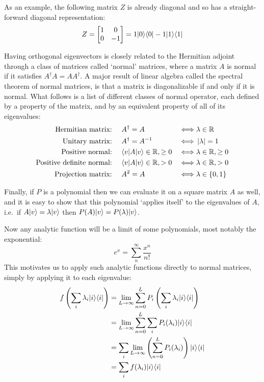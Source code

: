 As an example, the following matrix $Z$ is already diagonal and so has a straight-forward diagonal representation:
\begin{align*}
	Z = \left[\begin{matrix}
		1&0\\
		0&-1
	\end{matrix}\right] = 1| 0 \rangle\langle 0 | - 1| 1 \rangle\langle 1 |
\end{align*}

Having orthogonal eigenvectors is closely related to the Hermitian adjoint through a class of matrices called `normal' matrices, where a matrix $A$ is normal if it satisfies $A^\dagger A = AA^\dagger$. A major result of linear algebra called the spectral theorem of normal matrices, is that a matrix is diagonalizable if and only if it is normal. What follows is a list of different classes of normal operator, each defined by a property of the matrix, and by an equivalent property of all of its eigenvalues:
\begin{align*}
	\text{Hermitian matrix:\ }&&& A^\dagger = A & \iff& \lambda \in \mathbb{R} \\
	\text{Unitary matrix:\ }&&& A^\dagger = A^{-1} & \iff& \left| \lambda \right|=1 \\
	\text{Positive normal:\ }&&& \langle v |A| v \rangle \in \mathbb{R}, \geq 0 & \iff& \lambda \in \mathbb{R}, \geq 0 \\
	\text{Positive definite normal:\ }&&& \langle v |A| v \rangle \in \mathbb{R}, > 0 & \iff& \lambda \in \mathbb{R}, > 0 \\
	\text{Projection matrix:\ }&&& A^2 = A & \iff& \lambda \in \{0, 1\} \\
\end{align*}

Finally, if $P$ is a polynomial then we can evaluate it on a square matrix $A$ as well, and it is easy to show that this polynomial `applies itself' to the eigenvalues of $A$, i.e.\ if $A| v \rangle = \lambda| v \rangle$ then $P(A)| v \rangle = P(\lambda)| v \rangle$.

Now any analytic function will be a limit of some polynomials, most notably the exponential:
\[e^x = \sum_n^\infty \frac{x^n}{n!}\]
This motivates us to apply such analytic functions directly to normal matrices, simply by applying it to each eigenvalue:
\begin{align*}
	f\left(\sum_i \lambda_i| i \rangle\langle i |\right)
	&= \lim_{L \to \infty} \sum_{n=0}^L P_i\left(\sum_i \lambda_i| i \rangle\langle i |\right)
	\\&= \lim_{L \to \infty} \sum_{n=0}^L \sum_i P_i(\lambda_i)| i \rangle\langle i |
	\\&= \sum_i \lim_{L \to \infty} \left(\sum_{n=0}^L  P_i(\lambda_i)\right)| i \rangle\langle i |
	\\&= \sum_i f(\lambda_i)| i \rangle\langle i |
\end{align*}

